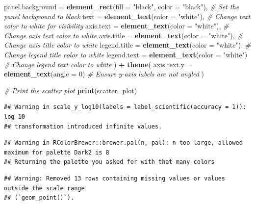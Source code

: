 \documentclass[
]{article}
\newenvironment{Shaded}{\begin{snugshade}}{\end{snugshade}}
\newcommand{\AttributeTok}[1]{\textcolor[rgb]{0.13,0.29,0.53}{#1}}
\newcommand{\CommentTok}[1]{\textcolor[rgb]{0.56,0.35,0.01}{\textit{#1}}}
\newcommand{\DecValTok}[1]{\textcolor[rgb]{0.00,0.00,0.81}{#1}}
\newcommand{\FunctionTok}[1]{\textcolor[rgb]{0.13,0.29,0.53}{\textbf{#1}}}
\newcommand{\NormalTok}[1]{#1}
\newcommand{\SpecialCharTok}[1]{\textcolor[rgb]{0.81,0.36,0.00}{\textbf{#1}}}
\newcommand{\StringTok}[1]{\textcolor[rgb]{0.31,0.60,0.02}{#1}}
\begin{document}
\begin{Shaded}
\begin{Highlighting}[]
    \AttributeTok{panel.background =} \FunctionTok{element\_rect}\NormalTok{(}\AttributeTok{fill =} \StringTok{"black"}\NormalTok{, }\AttributeTok{color =} \StringTok{"black"}\NormalTok{), }\CommentTok{\# Set the panel background to black}
    \AttributeTok{text =} \FunctionTok{element\_text}\NormalTok{(}\AttributeTok{color =} \StringTok{"white"}\NormalTok{), }\CommentTok{\# Change text color to white for visibility}
    \AttributeTok{axis.text =} \FunctionTok{element\_text}\NormalTok{(}\AttributeTok{color =} \StringTok{"white"}\NormalTok{), }\CommentTok{\# Change axis text color to white}
    \AttributeTok{axis.title =} \FunctionTok{element\_text}\NormalTok{(}\AttributeTok{color =} \StringTok{"white"}\NormalTok{), }\CommentTok{\# Change axis title color to white}
    \AttributeTok{legend.title =} \FunctionTok{element\_text}\NormalTok{(}\AttributeTok{color =} \StringTok{"white"}\NormalTok{), }\CommentTok{\# Change legend title color to white}
    \AttributeTok{legend.text =} \FunctionTok{element\_text}\NormalTok{(}\AttributeTok{color =} \StringTok{"white"}\NormalTok{) }\CommentTok{\# Change legend text color to white}
\NormalTok{  ) }\SpecialCharTok{+}
  \FunctionTok{theme}\NormalTok{(}
    \AttributeTok{axis.text.y =} \FunctionTok{element\_text}\NormalTok{(}\AttributeTok{angle =} \DecValTok{0}\NormalTok{)  }\CommentTok{\# Ensure y{-}axis labels are not angled}
\NormalTok{  )}

\CommentTok{\# Print the scatter plot}
\FunctionTok{print}\NormalTok{(scatter\_plot)}
\end{Highlighting}
\end{Shaded}

\begin{verbatim}
## Warning in scale_y_log10(labels = label_scientific(accuracy = 1)): log-10
## transformation introduced infinite values.
\end{verbatim}

\begin{verbatim}
## Warning in RColorBrewer::brewer.pal(n, pal): n too large, allowed maximum for palette Dark2 is 8
## Returning the palette you asked for with that many colors
\end{verbatim}

\begin{verbatim}
## Warning: Removed 13 rows containing missing values or values outside the scale range
## (`geom_point()`).
\end{verbatim}
\end{document}
